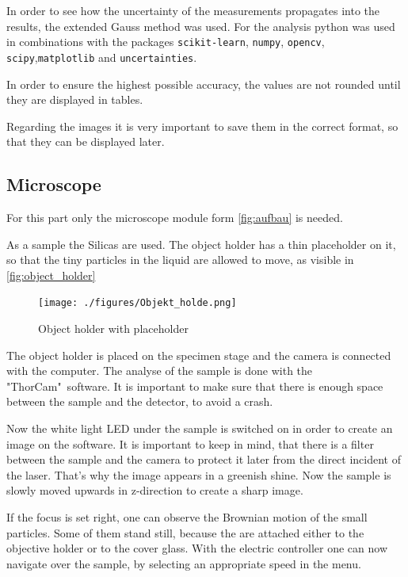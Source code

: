 \documentclass[12pt,english]{scrartcl}
\begin{document}
In order to see how the uncertainty of the measurements propagates into the
results, the extended Gauss method was used. For the analysis python was used
in combinations with the packages \verb#scikit-learn#, \verb#numpy#,
\verb#opencv#, \verb#scipy#,\verb#matplotlib# and \verb#uncertainties#.

In order to ensure the highest possible accuracy, the values are not rounded
until they are displayed in tables.

Regarding the images it is very important to save them in the correct format,
so that they can be displayed later.

\subsection{Microscope}\label{seq:durchfurung_microscope}

For this part only the microscope module form \autoref{fig:aufbau} is needed.

As a sample the Silicas are used. The object holder has a thin placeholder on
it, so that the tiny particles in the liquid are allowed to move, as visible in
\autoref{fig:object_holder}

\begin{figure}[H]
	\begin{center}
		\texttt{[image: ./figures/Objekt\_holde.png]}
	\end{center}
	\caption[Object holder with placeholder] { Object holder with placeholder
	}\label{fig:object_holder}
\end{figure}

The object holder is placed on the specimen stage and the camera is connected
with the computer. The analyse of the sample is done with the "ThorCam"\
software. It is important to make sure that there is enough space between the
sample and the detector, to avoid a crash.

Now the white light LED under the sample is switched on in order to create an
image on the software. It is important to keep in mind, that there is a filter
between the sample and the camera to protect it later from the direct incident
of the laser. That's why the image appears in a greenish shine. Now the sample
is slowly moved upwards in z-direction to create a sharp image.

If the focus is set right, one can observe the Brownian motion of the small
particles. Some of them stand still, because the are attached either to the
objective holder or to the cover glass. With the electric controller one can
now navigate over the sample, by selecting an appropriate speed in the menu.
\end{document}
